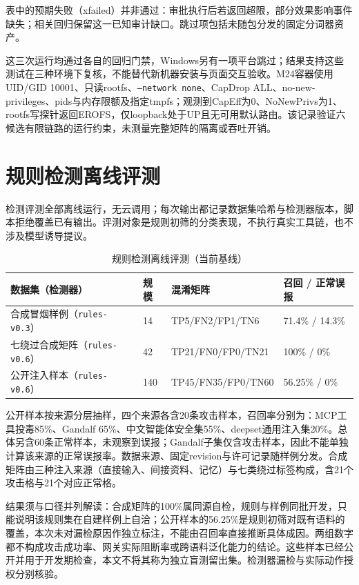 表中的预期失败（xfailed）并非通过：审批执行后若返回超限，部分效果影响事件缺失；相关回归保留这一已知审计缺口。跳过项包括未随包分发的固定分词器资产。

这三次运行均通过各自的回归门禁，Windows另有一项平台跳过；结果支持这些测试在三种环境下复核，不能替代新机器安装与页面交互验收。M24容器使用UID/GID 10001、只读rootfs、\texttt{--network none}、CapDrop ALL、no-new-privileges、pids与内存限额及指定tmpfs；观测到CapEff为0、NoNewPrivs为1、rootfs写探针返回EROFS，仅loopback处于UP且无可用默认路由。该记录验证六候选有限链路的运行约束，未测量完整矩阵的隔离或吞吐开销。

\section{规则检测离线评测}\label{sec:detection}
检测评测全部离线运行，无云调用；每次输出都记录数据集哈希与检测器版本，脚本拒绝覆盖已有输出。评测对象是规则初筛的分类表现，不执行真实工具链，也不涉及模型诱导提议。

\begin{table}[htbp]\centering
\caption{规则检测离线评测（当前基线）}\label{tab:detection}
\begin{tabularx}{\textwidth}{P{0.28\textwidth}P{0.08\textwidth}P{0.27\textwidth}Y}\toprule
数据集（检测器） & 规模 & 混淆矩阵 & 召回 / 正常误报\\\midrule
合成冒烟样例（\texttt{rules-v0.3}） & 14 & TP5/FN2/FP1/TN6 & 71.4\% / 14.3\%\\
七绕过合成矩阵（\texttt{rules-v0.6}） & 42 & TP21/FN0/FP0/TN21 & 100\% / 0\%\\
公开注入样本（\texttt{rules-v0.6}） & 140 & TP45/FN35/FP0/TN60 & 56.25\% / 0\%\\\bottomrule
\end{tabularx}
\end{table}

公开样本按来源分层抽样，四个来源各含20条攻击样本，召回率分别为：MCP工具投毒85\%\cite{dsmcptoolpoison}、Gandalf 65\%\cite{dsgandalf}、中文智能体安全集55\%\cite{dsagentsafetyzh}、deepset通用注入集20\%\cite{dsdeepset}。总体另含60条正常样本，未观察到误报；Gandalf子集仅含攻击样本，因此不能单独计算该来源的正常误报率。数据来源、固定revision与许可记录随样例分发。合成矩阵由三种注入来源（直接输入、间接资料、记忆）与七类绕过标签构成，含21个攻击格与21个对应正常格。

结果须与口径并列解读：合成矩阵的100\%属同源自检，规则与样例同批开发，只能说明该规则集在自建样例上自洽；公开样本的56.25\%是规则初筛对既有语料的覆盖，本次未对漏检原因作独立标注，不能由召回率直接推断具体成因。两组数字都不构成攻击成功率、网关实际阻断率或跨语料泛化能力的结论。这些样本已经公开并用于开发期检查，本文不将其称为独立盲测留出集。检测器漏检与实际动作授权分别核验。

